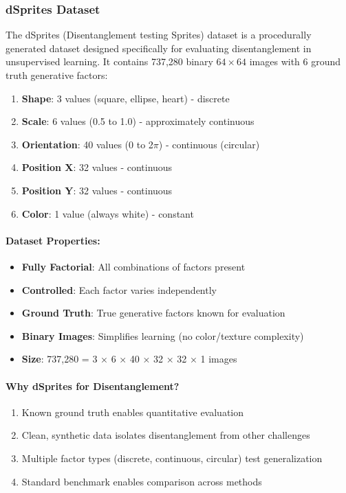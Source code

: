 \documentclass[conference]{IEEEtran}
\begin{document}
\subsubsection{dSprites Dataset}

The dSprites (Disentanglement testing Sprites) dataset is a procedurally generated dataset designed specifically for evaluating disentanglement in unsupervised learning. It contains 737,280 binary $64 \times 64$ images with 6 ground truth generative factors:

\begin{enumerate}
    \item \textbf{Shape}: 3 values (square, ellipse, heart) - discrete
    \item \textbf{Scale}: 6 values (0.5 to 1.0) - approximately continuous
    \item \textbf{Orientation}: 40 values (0 to 2$\pi$) - continuous (circular)
    \item \textbf{Position X}: 32 values - continuous
    \item \textbf{Position Y}: 32 values - continuous
    \item \textbf{Color}: 1 value (always white) - constant
\end{enumerate}

\paragraph{Dataset Properties:}
\begin{itemize}
    \item \textbf{Fully Factorial}: All combinations of factors present
    \item \textbf{Controlled}: Each factor varies independently
    \item \textbf{Ground Truth}: True generative factors known for evaluation
    \item \textbf{Binary Images}: Simplifies learning (no color/texture complexity)
    \item \textbf{Size}: 737,280 = 3 × 6 × 40 × 32 × 32 × 1 images
\end{itemize}

\paragraph{Why dSprites for Disentanglement?}
\begin{enumerate}
    \item Known ground truth enables quantitative evaluation
    \item Clean, synthetic data isolates disentanglement from other challenges
    \item Multiple factor types (discrete, continuous, circular) test generalization
    \item Standard benchmark enables comparison across methods
\end{enumerate}
\end{document}
